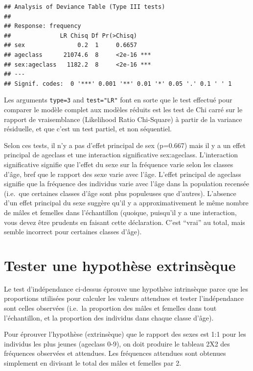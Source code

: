 \documentclass[
  12pt,
]{book}
\begin{document}
\begin{verbatim}
## Analysis of Deviance Table (Type III tests)
## 
## Response: frequency
##              LR Chisq Df Pr(>Chisq)    
## sex               0.2  1     0.6657    
## ageclass      21074.6  8     <2e-16 ***
## sex:ageclass   1182.2  8     <2e-16 ***
## ---
## Signif. codes:  0 '***' 0.001 '**' 0.01 '*' 0.05 '.' 0.1 ' ' 1
\end{verbatim}

Les arguments \texttt{type=3} and \texttt{test="LR"} font en sorte que le test effectué pour comparer le modèle complet aux modèles réduits est les test de Chi carré sur le rapport de vraisemblance (Likelihood Ratio Chi-Square) à partir de la variance résiduelle, et que c'est un test partiel, et non séquentiel.

Selon ces tests, il n'y a pas d'effet principal de sex (p=0.667) mais il y a un effet principal de ageclass et une interaction significative sex:ageclass. L'interaction significative signifie que l'effet du sexe sur la fréquence varie selon les classes d'âge, bref que le rapport des sexe varie avec l'âge. L'effet principal de ageclass signifie que la fréquence des individus varie avec l'âge dans la population recensée (i.e.~que certaines classes d'âge sont plus populeuses que d'autres). L'absence d'un effet principal du sexe suggère qu'il y a approximativement le même nombre de mâles et femelles dans l'échantillon (quoique, puisqu'il y a une interaction, vous devez être prudents en faisant cette déclaration. C'est ``vrai'' au total, mais semble incorrect pour certaines classes d'âge).

\hypertarget{tester-une-hypothuxe8se-extrinsuxe8que}{%
\section{Tester une hypothèse extrinsèque}\label{tester-une-hypothuxe8se-extrinsuxe8que}}

Le test d'indépendance ci-dessus éprouve une hypothèse intrinsèque parce que les proportions utilisées pour calculer les valeurs attendues et tester l'indépendance sont celles observées (i.e.~la proportion des mâles et femelles dans tout l'échantillon, et la proportion des individus dans chaque classe d'âge).

Pour éprouver l'hypothèse (extrinsèque) que le rapport des sexes est 1:1 pour les individus les plus jeunes (ageclass 0-9), on doit produire le tableau 2X2 des fréquences observées et attendues. Les fréquences attendues sont obtenues simplement en divisant le total des mâles et femelles par 2.
\end{document}
